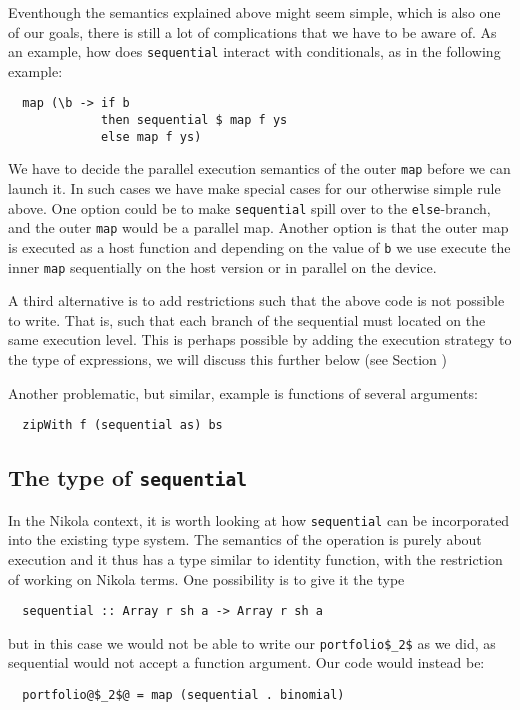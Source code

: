 Eventhough the semantics explained above might seem simple, which is
also one of our goals, there is still a lot of complications that we
have to be aware of. As an example, how does \lstinline{sequential}
interact with conditionals, as in the following example:
\begin{lstlisting}
  map (\b -> if b 
             then sequential $ map f ys 
             else map f ys)
\end{lstlisting}
We have to decide the parallel execution semantics of the outer
\lstinline{map} before we can launch it. In such cases we have make
special cases for our otherwise simple rule above. One option could be
to make \lstinline{sequential} spill over to the
\lstinline{else}-branch, and the outer \lstinline{map} would be a
parallel map. Another option is that the outer map is executed as a
host function and depending on the value of \lstinline{b} we use
execute the inner \lstinline{map} sequentially on the host version or
in parallel on the device.

A third alternative is to add restrictions such that the above code is
not possible to write. That is, such that each branch of the
sequential must located on the same execution level. This is perhaps
possible by adding the execution strategy to the type of expressions,
we will discuss this further below (see Section )

Another problematic, but similar, example is functions of several arguments:
\begin{lstlisting}
  zipWith f (sequential as) bs
\end{lstlisting}

\subsection{The type of \texttt{sequential}}
In the Nikola context, it is worth looking at how
\lstinline{sequential} can be incorporated into the existing type
system. The semantics of the operation is purely about execution and
it thus has a type similar to identity function, with the restriction
of working on Nikola terms. One possibility is to give it the type
\begin{lstlisting}
  sequential :: Array r sh a -> Array r sh a
\end{lstlisting}
but in this case we would not be able to write our
\lstinline[mathescape]{portfolio$_2$} as we did, as sequential would
not accept a function argument. Our code would instead be:
\begin{lstlisting}
  portfolio@$_2$@ = map (sequential . binomial)
\end{lstlisting}

